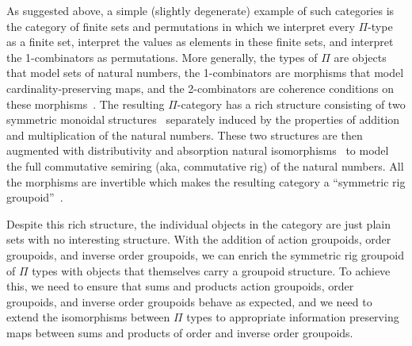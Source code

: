 As suggested above, a simple (slightly degenerate) example of such
categories is the category of finite sets and permutations in which we
interpret every $\Pi$-type as a finite set, interpret the values as
elements in these finite sets, and interpret the 1-combinators as
permutations. More generally, the types of $\Pi$ are objects that
model sets of natural numbers, the 1-combinators are morphisms that
model cardinality-preserving maps, and the 2-combinators are coherence
conditions on these morphisms~\cite{Carette2016}. The resulting
$\Pi$-category has a rich structure consisting of two symmetric
monoidal structures~\cite{nla.cat-vn1051288} separately induced by the
properties of addition and multiplication of the natural
numbers. These two structures are then augmented with distributivity
and absorption natural isomorphisms~\cite{laplaza} to model the full
commutative semiring (aka, commutative rig) of the natural
numbers. All the morphisms are invertible which makes the resulting
category a ``symmetric rig groupoid''~\cite{nlabrig}.

Despite this rich structure, the individual objects in the category
are just plain sets with no interesting structure. With the addition
of action groupoids, order groupoids, and inverse order groupoids, we
can enrich the symmetric rig groupoid of $\Pi$ types with objects that
themselves carry a groupoid structure. To achieve this, we need to
ensure that sums and products action groupoids, order groupoids, and
inverse order groupoids behave as expected, and we need to extend the
isomorphisms between $\Pi$ types to appropriate information preserving
maps between sums and products of order and inverse order groupoids. 






